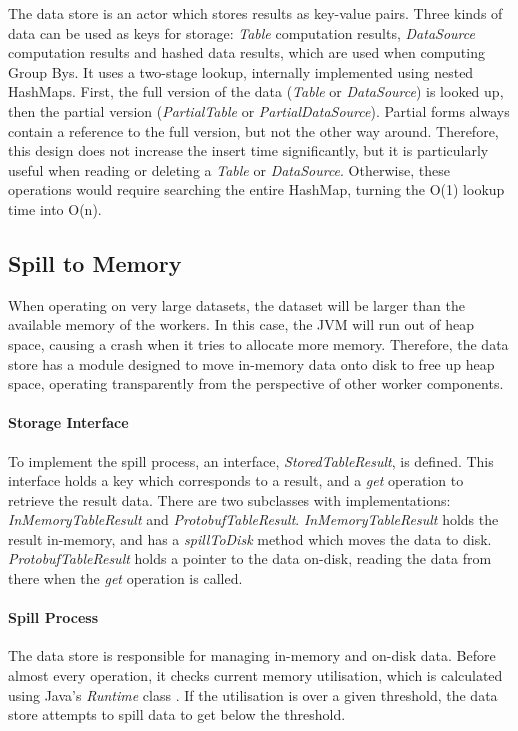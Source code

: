 The data store is an actor which stores results as key-value pairs. Three kinds of data can be used as keys for storage: \textit{Table} computation results, \textit{DataSource} computation results and hashed data results, which are used when computing Group Bys. It uses a two-stage lookup, internally implemented using nested HashMaps. First, the full version of the data (\textit{Table} or \textit{DataSource}) is looked up, then the partial version (\textit{PartialTable} or \textit{PartialDataSource}). Partial forms always contain a reference to the full version, but not the other way around. Therefore, this design does not increase the insert time significantly, but it is particularly useful when reading or deleting a \textit{Table} or \textit{DataSource}. Otherwise, these operations would require searching the entire HashMap, turning the O(1) lookup time into O(n).

\subsection{Spill to Memory}
When operating on very large datasets, the dataset will be larger than the available memory of the workers. In this case, the JVM will run out of heap space, causing a crash when it tries to allocate more memory. Therefore, the data store has a module designed to move in-memory data onto disk to free up heap space, operating transparently from the perspective of other worker components. 

\paragraph{Storage Interface}
To implement the spill process, an interface, \textit{StoredTableResult}, is defined. This interface holds a key which corresponds to a result, and a \textit{get} operation to retrieve the result data. There are two subclasses with implementations: \textit{InMemoryTableResult} and \textit{ProtobufTableResult}. \textit{InMemoryTableResult} holds the result in-memory, and has a \textit{spillToDisk} method which moves the data to disk. \textit{ProtobufTableResult} holds a pointer to the data on-disk, reading the data from there when the \textit{get} operation is called.

\paragraph{Spill Process}
The data store is responsible for managing in-memory and on-disk data. Before almost every operation, it checks current memory utilisation, which is calculated using Java's \textit{Runtime} class \cite{javaruntimeclass}. If the utilisation is over a given threshold, the data store attempts to spill data to get below the threshold.

